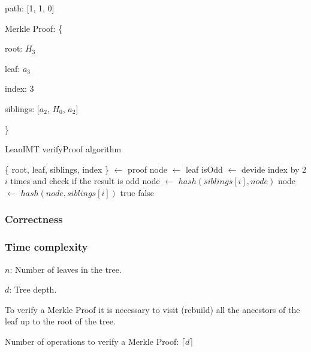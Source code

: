 \documentclass{article}
\begin{document}
\bigbreak

path: [1, 1, 0]

Merkle Proof: \{

root: $H_3$

leaf: $a_3$

index: 3

siblings: [$a_2$, $H_0$, $a_2$]

\}

\bigbreak

\bigbreak

\begin{algorithm}[H]
    \caption{LeanIMT verifyProof algorithm}\label{verifyProof}
    \begin{algorithmic}[1]
        \State \{ root, leaf, siblings, index \} $\gets$ proof 
        \State node $\gets$ leaf
        \State isOdd $\gets$ devide index by 2 $i$ times and check if the result is odd
         
        \State node $\gets$ $hash(siblings[i], node)$
        \Else {}
        \State node $\gets$ $hash(node, siblings[i])$
        \EndIf
        \EndFor
        \State \Return true
        \Else
        \State \Return false
        \EndIf
        \EndProcedure
    \end{algorithmic}
\end{algorithm}

\bigbreak

\subsubsection{Correctness}

\bigbreak

\subsubsection{Time complexity}

\bigbreak

$n$: Number of leaves in the tree.

$d$: Tree depth.

\bigbreak

To verify a Merkle Proof it is necessary to visit (rebuild) all the ancestors of the leaf up to the root of the tree.

\bigbreak

Number of operations to verify a Merkle Proof: $\lceil d \rceil$
\end{document}
